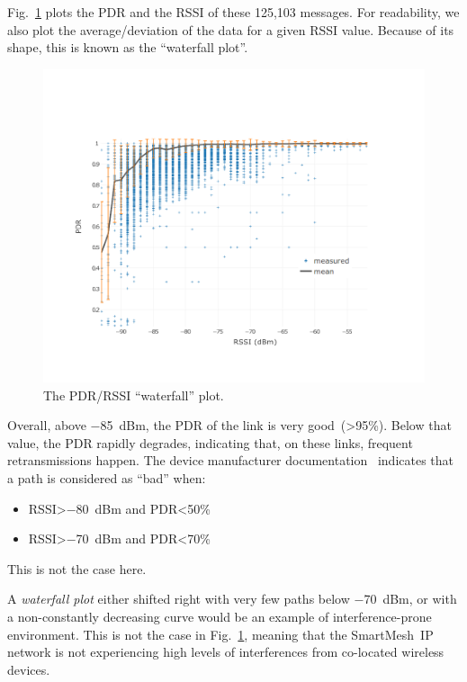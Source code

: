 \documentclass{sig-alternate}
\newcommand{\smip}                {SmartMesh~IP\xspace}
\begin{document}

Fig.~\ref{fig:waterfall} plots the PDR and the RSSI of these 125,103 messages.
For readability, we also plot the average/deviation of the data for a given RSSI value.
Because of its shape, this is known as the ``waterfall plot''.

\begin{figure}
    \centering
    \includegraphics[width=\columnwidth]{waterfall}
    \caption{
        The PDR/RSSI ``waterfall'' plot.
    }
    \label{fig:waterfall}
\end{figure}

Overall, above $-$85~dBm, the PDR of the link is very good~(>95\%).
Below that value, the PDR rapidly degrades, indicating that, on these links, frequent retransmissions happen.
The device manufacturer documentation~\cite{smip_app_note} indicates that a path is considered as ``bad'' when:

\begin{itemize}
  \item RSSI>$-$80~dBm and PDR<50\%
  \item RSSI>$-$70~dBm and PDR<70\%
\end{itemize}

This is not the case here.


A \textit{waterfall plot} either shifted right with very few paths below $-$70~dBm, or with a non-constantly decreasing curve would be an example of interference-prone environment.
This is not the case in Fig.~\ref{fig:waterfall}, meaning that the \smip network is not experiencing high levels of interferences from co-located wireless devices.
\end{document}
